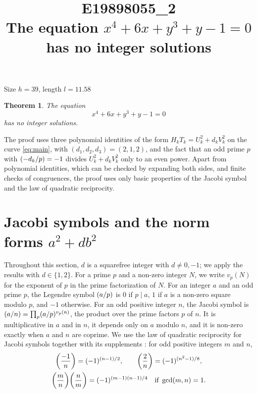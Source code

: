 \documentclass[11pt]{article}
\title{\textbf{E19898055\_2}\\[4pt] {\Large The equation $x^{4}+6x+y^{3}+y-1=0$ has no integer solutions}}
\author{}
\date{}
\newtheorem{theorem}{Theorem}
\newcommand{\leg}[2]{\mathchoice{\biggl(\dfrac{#1}{#2}\biggr)}{(#1/#2)}{(#1/#2)}{(#1/#2)}}
\begin{document}
\maketitle
\vspace{-8ex}
\begin{center}
Size $h=39$, length $l=11.58$
\end{center}

\begin{theorem}\label{thm:main}
The equation
\begin{equation}\label{eq:main}
x^{4}+6x+y^{3}+y-1=0
\end{equation}
has no integer solutions.
\end{theorem}

The proof uses three polynomial identities of the form $H_kT_k=U_k^2+d_kV_k^2$ on the curve \eqref{eq:main}, with $(d_1,d_2,d_3)=(2,1,2)$, and the fact that an odd prime $p$ with $\leg{-d_k}{p}=-1$ divides $U_k^2+d_kV_k^2$ only to an even power. Apart from polynomial identities, which can be checked by expanding both sides, and finite checks of congruences, the proof uses only basic properties of the Jacobi symbol and the law of quadratic reciprocity.

\section{Jacobi symbols and the norm forms $a^2+db^2$}

Throughout this section, $d$ is a squarefree integer with $d\neq0,-1$; we apply the results with $d\in\{1,2\}$. For a prime $p$ and a non-zero integer $N$, we write $v_p(N)$ for the exponent of $p$ in the prime factorization of $N$. For an integer $a$ and an odd prime $p$, the Legendre symbol $\leg{a}{p}$ is $0$ if $p\mid a$, $1$ if $a$ is a non-zero square modulo $p$, and $-1$ otherwise. For an odd positive integer $n$, the Jacobi symbol is $\leg{a}{n}=\prod_p\leg{a}{p}^{v_p(n)}$, the product over the prime factors $p$ of $n$. It is multiplicative in $a$ and in $n$, it depends only on $a$ modulo $n$, and it is non-zero exactly when $a$ and $n$ are coprime. We use the law of quadratic reciprocity for Jacobi symbols together with its supplements \cite[Chapter~5, \S2]{IR}: for odd positive integers $m$ and $n$,
\begin{gather*}
\leg{-1}{n}=(-1)^{(n-1)/2},\qquad\leg{2}{n}=(-1)^{(n^2-1)/8},\\
\leg{m}{n}\leg{n}{m}=(-1)^{(m-1)(n-1)/4}\quad\text{if }\gcd(m,n)=1.
\end{gather*}
\end{document}
